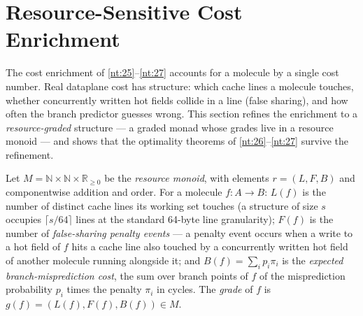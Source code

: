 \section{Resource-Sensitive Cost Enrichment}\label{sec:enrich-graded}

The cost enrichment of \autoref{nt:25}--\autoref{nt:27} accounts for a
molecule by a single cost number. Real dataplane cost has structure:
which cache lines a molecule touches, whether concurrently written hot
fields collide in a line (false sharing), and how often the branch
predictor guesses wrong. This section refines the enrichment to a
\emph{resource-graded} structure --- a graded monad whose grades live in
a resource monoid --- and shows that the optimality theorems of
\ref{nt:26}--\ref{nt:27} survive the refinement.

\begin{definition}\label{def:grades}
Let $M = \mathbb{N} \times \mathbb{N} \times \mathbb{R}_{\ge 0}$ be the
\emph{resource monoid}, with elements $r = (L, F, B)$ and componentwise
addition and order. For a molecule $f \colon A \to B$: $L(f)$ is the
number of distinct cache lines its working set touches (a structure of
size $s$ occupies $\lceil s/64 \rceil$ lines at the standard 64-byte
line granularity); $F(f)$ is the number of \emph{false-sharing penalty
events} --- a penalty event occurs when a write to a hot field of $f$
hits a cache line also touched by a concurrently written hot field of
another molecule running alongside it; and $B(f) = \sum_i p_i \pi_i$ is
the \emph{expected branch-misprediction cost}, the sum over branch
points of $f$ of the misprediction probability $p_i$ times the penalty
$\pi_i$ in cycles. The \emph{grade} of $f$ is $g(f) = (L(f), F(f),
B(f)) \in M$.
\end{definition}

